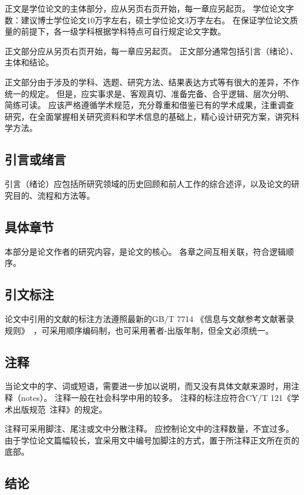 正文是学位论文的主体部分，应从另页右页开始，每一章应另起页。
学位论文字数：建议博士学位论文10万字左右，硕士学位论文3万字左右。
在保证学位论文质量的前提下，各一级学科根据学科特点可自行规定论文字数。

正文部分应从另页右页开始，每一章应另起页。
正文部分通常包括引言（绪论）、主体和结论。

正文部分由于涉及的学科、选题、研究方法、结果表达方式等有很大的差异，不作统一的规定。
但是，应实事求是、客观真切、准备完备、合乎逻辑、层次分明、简练可读。
应该严格遵循学术规范，充分尊重和借鉴已有的学术成果，注重调查研究，在全面掌握相关研究资料和学术信息的基础上，精心设计研究方案，讲究科学方法。

\subsection{引言或绪言}

引言（绪论）应包括所研究领域的历史回顾和前人工作的综合述评，以及论文的研究目的、流程和方法等。

\subsection{具体章节}

本部分是论文作者的研究内容，是论文的核心。
各章之间互相关联，符合逻辑顺序。

\subsection{引文标注}

论文中引用的文献的标注方法遵照最新的GB/T 7714 《信息与文献参考文献著录规则》~\cite{SCSF00045714}，可采用顺序编码制，也可采用著者-出版年制，但全文必须统一。

\subsection{注释}

当论文中的字、词或短语，需要进一步加以说明，而又没有具体文献来源时，用注释（notes）。
注释一般在社会科学中用的较多。
注释的标注应符合CY/T 121《学术出版规范~注释》的规定。

注释可采用脚注、尾注或文中分散注释。
应控制论文中的注释数量，不宜过多。
由于学位论文篇幅较长，宜采用文中编号加脚注的方式，置于所注释正文所在页的底部。

\subsection{结论}

